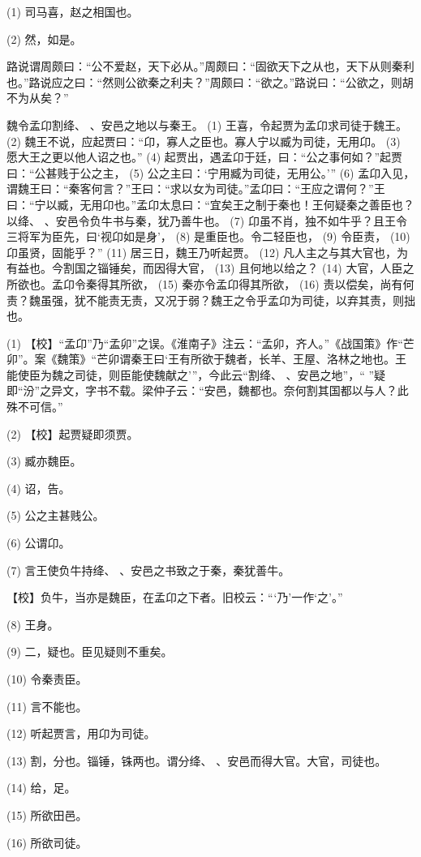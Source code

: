 \documentclass[12pt,UTF8]{ctexbook}
\begin{document}
(1) 司马喜，赵之相国也。

(2) 然，如是。

路说谓周颇曰：“公不爱赵，天下必从。”周颇曰：“固欲天下之从也，天下从则秦利也。”路说应之曰：“然则公欲秦之利夫？”周颇曰：“欲之。”路说曰：“公欲之，则胡不为从矣？”

魏令孟卬割绛、 、安邑之地以与秦王。 (1) 王喜，令起贾为孟卬求司徒于魏王。 (2) 魏王不说，应起贾曰：“卬，寡人之臣也。寡人宁以臧为司徒，无用卬。 (3) 愿大王之更以他人诏之也。” (4) 起贾出，遇孟卬于廷，曰：“公之事何如？”起贾曰：“公甚贱于公之主， (5) 公之主曰：‘宁用臧为司徒，无用公。’” (6) 孟卬入见，谓魏王曰：“秦客何言？”王曰：“求以女为司徒。”孟卬曰：“王应之谓何？”王曰：“宁以臧，无用卬也。”孟卬太息曰：“宜矣王之制于秦也！王何疑秦之善臣也？以绛、 、安邑令负牛书与秦，犹乃善牛也。 (7) 卬虽不肖，独不如牛乎？且王令三将军为臣先，曰‘视卬如是身’， (8) 是重臣也。令二轻臣也， (9) 令臣责， (10) 卬虽贤，固能乎？” (11) 居三日，魏王乃听起贾。 (12) 凡人主之与其大官也，为有益也。今割国之锱锤矣，而因得大官， (13) 且何地以给之？ (14) 大官，人臣之所欲也。孟卬令秦得其所欲， (15) 秦亦令孟卬得其所欲， (16) 责以偿矣，尚有何责？魏虽强，犹不能责无责，又况于弱？魏王之令乎孟卬为司徒，以弃其责，则拙也。

(1) 【校】“孟卬”乃“孟卯”之误。《淮南子》注云：“孟卯，齐人。”《战国策》作“芒卯”。案《魏策》“芒卯谓秦王曰‘王有所欲于魏者，长羊、王屋、洛林之地也。王能使臣为魏之司徒，则臣能使魏献之’”，今此云“割绛、 、安邑之地”，“ ”疑即“汾”之异文，字书不载。梁仲子云：“安邑，魏都也。奈何割其国都以与人？此殊不可信。”

(2) 【校】起贾疑即须贾。

(3) 臧亦魏臣。

(4) 诏，告。

(5) 公之主甚贱公。

(6) 公谓卬。

(7) 言王使负牛持绛、 、安邑之书致之于秦，秦犹善牛。

【校】负牛，当亦是魏臣，在孟卬之下者。旧校云：“‘乃’一作‘之’。”

(8) 王身。

(9) 二，疑也。臣见疑则不重矣。

(10) 令秦责臣。

(11) 言不能也。

(12) 听起贾言，用卬为司徒。

(13) 割，分也。锱锤，铢两也。谓分绛、 、安邑而得大官。大官，司徒也。

(14) 给，足。

(15) 所欲田邑。

(16) 所欲司徒。
\end{document}
